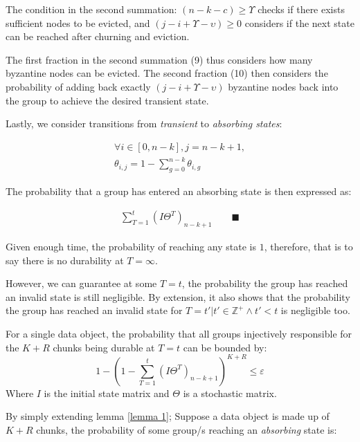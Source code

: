 The condition in the second summation: $(n-k-c)\geq \Upsilon$ checks if there exists sufficient nodes to be evicted, and $(j-i+\Upsilon-\upsilon) \geq 0$ considers if the next state can be reached after churning and eviction. 

The first fraction in the second summation (9) thus considers how many byzantine nodes can be evicted. The second fraction (10) then considers the probability of adding back exactly $(j-i+\Upsilon-\upsilon)$ byzantine nodes back into the group to achieve the desired transient state. 

Lastly, we consider transitions from \textit{transient} to \textit{absorbing states}:

\begin{gather}
     \forall i\in[0, n-k], j = n-k+1, \\
     \theta_{i,j} = 
     1- \sum_{g = 0}^{n-k} \theta_{i,g}
\end{gather}

The probability that a group has entered an absorbing state is then expressed as:

\begin{gather}
    \sum_{T=1}^{t} (I \Theta^{T})_{n-k+1} \qquad\blacksquare
\end{gather}

Given enough time, the probability of reaching any state is $1$, therefore, that is to say there is no durability at $T=\infty$. 

However, we can guarantee at some $T=t$, the probability the group has reached an invalid state is still negligible. By extension, it also shows that the probability the group has reached an invalid state for $T=t'|t'\in \mathbb{Z}^{+} \wedge t'<t$ is negligible too. 


\begin{lemma}
    \label{lemma 2}
    For a single data object, the probability that all groups injectively responsible for the $K+R$ chunks being durable at $T=t$ can be bounded by: \[1-(1-\sum_{T=1}^{t} (I \Theta^{T})_{n-k+1})^{K+R} \leq \varepsilon\] Where $I$ is the initial state matrix and $\Theta$ is a stochastic matrix. 
\end{lemma}

By simply extending lemma \ref{lemma 1}; Suppose a data object is made up of $K+R$ chunks, the probability of some group/s reaching an  \textit{absorbing} state is:

